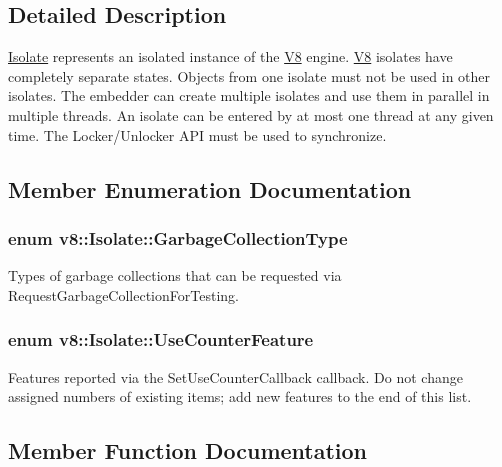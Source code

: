 \subsection{Detailed Description}
\hyperlink{classv8_1_1Isolate}{Isolate} represents an isolated instance of the \hyperlink{classv8_1_1V8}{V8} engine. \hyperlink{classv8_1_1V8}{V8} isolates have completely separate states. Objects from one isolate must not be used in other isolates. The embedder can create multiple isolates and use them in parallel in multiple threads. An isolate can be entered by at most one thread at any given time. The Locker/\+Unlocker A\+P\+I must be used to synchronize. 

\subsection{Member Enumeration Documentation}
\hypertarget{classv8_1_1Isolate_a5ae00cc99d8aca148c6f5f9698c432c9}{}
\subsubsection[{Garbage\+Collection\+Type}]{\setlength{\rightskip}{0pt plus 5cm}enum {\bf v8\+::\+Isolate\+::\+Garbage\+Collection\+Type}}\label{classv8_1_1Isolate_a5ae00cc99d8aca148c6f5f9698c432c9}
Types of garbage collections that can be requested via Request\+Garbage\+Collection\+For\+Testing. \hypertarget{classv8_1_1Isolate_aed6909379c3f2820cb3084710b73385d}{}
\subsubsection[{Use\+Counter\+Feature}]{\setlength{\rightskip}{0pt plus 5cm}enum {\bf v8\+::\+Isolate\+::\+Use\+Counter\+Feature}}\label{classv8_1_1Isolate_aed6909379c3f2820cb3084710b73385d}
Features reported via the Set\+Use\+Counter\+Callback callback. Do not change assigned numbers of existing items; add new features to the end of this list. 

\subsection{Member Function Documentation}
\hypertarget{classv8_1_1Isolate_a89656ac26d523c31fbfdbb12fb32f078}{}
